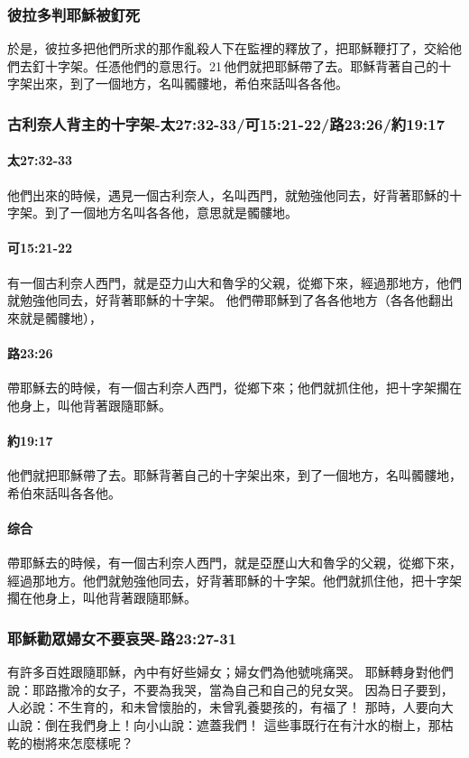\subsubsection{彼拉多判耶穌被釘死}
於是，彼拉多把他們所求的那作亂殺人下在監裡的釋放了，把耶穌鞭打了，交給他們去釘十字架。任憑他們的意思行。21 他們就把耶穌帶了去。耶穌背著自己的十字架出來，到了一個地方，名叫髑髏地，希伯來話叫各各他。



\subsubsection{古利奈人背主的十字架-太27:32-33/可15:21-22/路23:26/約19:17}
\paragraph{太27:32-33}他們出來的時候，遇見一個古利奈人，名叫西門，就勉強他同去，好背著耶穌的十字架。到了一個地方名叫各各他，意思就是髑髏地。
\paragraph{可15:21-22}有一個古利奈人西門，就是亞力山大和魯孚的父親，從鄉下來，經過那地方，他們就勉強他同去，好背著耶穌的十字架。
他們帶耶穌到了各各他地方（各各他翻出來就是髑髏地），
\paragraph{路23:26}帶耶穌去的時候，有一個古利奈人西門，從鄉下來；他們就抓住他，把十字架擱在他身上，叫他背著跟隨耶穌。
\paragraph{約19:17}
他們就把耶穌帶了去。耶穌背著自己的十字架出來，到了一個地方，名叫髑髏地，希伯來話叫各各他。
\paragraph{综合}
帶耶穌去的時候，有一個古利奈人西門，就是亞歷山大和魯孚的父親，從鄉下來，經過那地方。他們就勉強他同去，好背著耶穌的十字架。他們就抓住他，把十字架擱在他身上，叫他背著跟隨耶穌。

\subsubsection{耶穌勸眾婦女不要哀哭-路23:27-31}

有許多百姓跟隨耶穌，內中有好些婦女；婦女們為他號咷痛哭。
耶穌轉身對他們說：耶路撒冷的女子，不要為我哭，當為自己和自己的兒女哭。
因為日子要到，人必說：不生育的，和未曾懷胎的，未曾乳養嬰孩的，有福了！
那時，人要向大山說：倒在我們身上！向小山說：遮蓋我們！
這些事既行在有汁水的樹上，那枯乾的樹將來怎麼樣呢？

